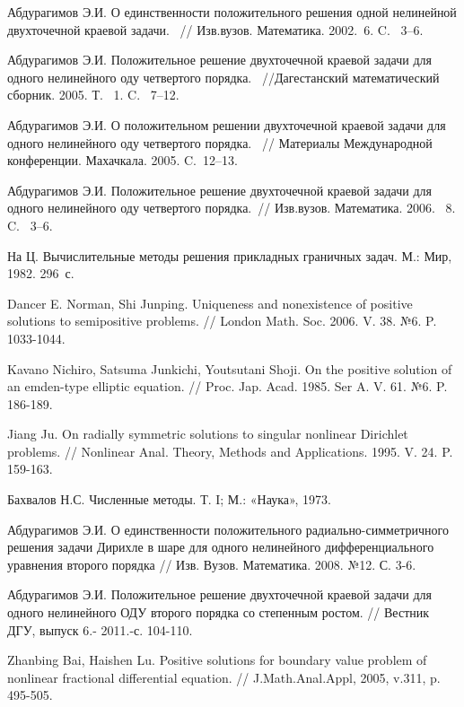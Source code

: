 \begin{thebibliography}{1}
Абдурагимов Э.И. О единственности положительного решения одной нелинейной
двухточечной краевой задачи. ~// Изв.вузов. Математика. 2002. \No\,6. C. ~3--6.

Абдурагимов Э.И. Положительное решение двухточечной краевой задачи для
одного нелинейного оду четвертого порядка. ~//Дагестанский математический
сборник. 2005. Т. ~1. C. ~7--12.

Абдурагимов Э.И. О положительном решении двухточечной краевой задачи  для
одного нелинейного оду четвертого порядка. ~// Материалы Международной
конференции. Махачкала. 2005. C.~12--13.

Абдурагимов Э.И. Положительное  решение двухточечной краевой задачи
для одного нелинейного оду четвертого порядка.~// Изв.вузов.
Математика. 2006. \No\, 8. C. ~3--6.

На Ц. Вычислительные методы решения прикладных граничных задач.
М.: Мир, 1982. 296~с.

Dancer E. Norman, Shi Junping. Uniqueness and nonexistence of positive solutions to semipositive problems. // London Math. Soc. 2006. V. 38. №6. P. 1033-1044.

Kavano Nichiro, Satsuma Junkichi, Youtsutani Shoji. On the positive solution of an emden-type elliptic equation.  // Proc. Jap. Acad. 1985. Ser A. V. 61. №6. P. 186-189.

Jiang Ju. On radially symmetric solutions to singular nonlinear Dirichlet problems. // Nonlinear Anal. Theory, Methods and Applications. 1995. V. 24. P. 159-163.

Бахвалов Н.С. Численные методы. Т. I; М.: «Наука», 1973.

Абдурагимов Э.И. О единственности положительного радиально-симметричного решения задачи Дирихле в шаре для одного нелинейного дифференциального уравнения второго порядка // Изв. Вузов. Математика. 2008. №12. С. 3-6.

Абдурагимов Э.И. Положительное решение двухточечной краевой задачи для одного нелинейного ОДУ второго порядка со степенным ростом. // Вестник ДГУ, выпуск 6.- 2011.-с. 104-110.


Zhanbing Bai, Haishen Lu. Positive solutions for boundary value problem of nonlinear fractional differential equation. // J.Math.Anal.Appl, 2005,  v.311,  p. 495-505.


\end{thebibliography}
